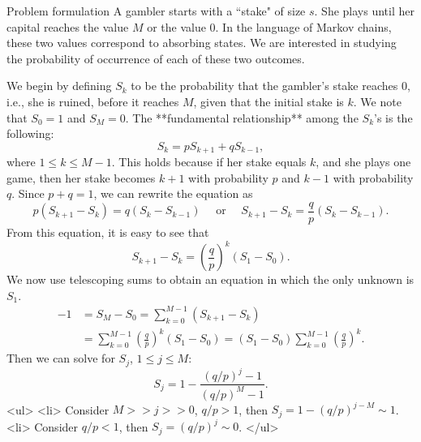 \begin{newnotion}{Problem formulation}
A gambler starts with a ``stake" of size $s$. She plays until her capital reaches the value $M$ or the value $0$. In the language of Markov chains, these two values correspond to absorbing states. We are interested in studying the probability of occurrence of each of these two outcomes.
\end{newnotion}
We begin by defining $S_k$ to be the probability that the gambler’s stake reaches 0, i.e., she is ruined, before it reaches $M$, given that the initial stake is $k$. We note that $S_0 = 1$ and $S_M = 0$. The **fundamental relationship** among the $S_k$’s is the following:
$$\begin{equation}
    S_{k}= p S_{k+1} + q S_{k-1},
\end{equation}$$
where $1 \leq k \leq M-1$. This holds because if her stake equals $k$, and she plays one game, then her stake becomes $k + 1$ with probability $p$ and $k-1$ with probability $q$. Since $p+q = 1$, we can rewrite the equation as 
$$\begin{equation}
    p\left(S_{k+1}-S_{k}\right)=q\left(S_{k}-S_{k-1}\right) \quad \text{ or }  \quad 
    S_{k+1}-S_{k}=\frac{q}{p}\left(S_{k}-S_{k-1}\right).
\end{equation}$$
From this equation, it is easy to see that
$$\begin{equation}
    S_{k+1}-S_{k}=\left(\frac{q}{p}\right)^{k}\left(S_{1}-S_{0}\right). 
\end{equation}$$
We now use telescoping sums to obtain an equation in which the only unknown is $S_1$.
$$\begin{equation}
    \begin{split}
        -1 &= S_M - S_0 = \sum_{k=0}^{M-1}\left(S_{k+1}-S_{k}\right) \\  
        &= \sum_{k=0}^{M-1}\left(\frac{q}{p}\right)^{k}\left(S_{1}-S_{0}\right) = \left(S_{1}-S_{0}\right) \sum_{k=0}^{M-1}\left(\frac{q}{p}\right)^{k}.
    \end{split}
\end{equation}$$
Then we can solve for $S_j$, $1\leq j \leq M$:
$$\begin{equation}
    S_{j}=1-\frac{(q / p)^{j}-1}{(q / p)^{M}-1}.
\end{equation}$$
<ul>
    <li> Consider $M >> j >> 0$, $q/p >1 $, then $S_j = 1-(q/p)^{j-M} \sim 1$.
    <li> Consider $q/p < 1$, then $S_j = (q/p)^j \sim 0$.
</ul>







